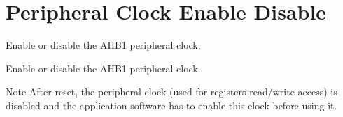\hypertarget{group___r_c_c_ex___peripheral___clock___enable___disable}{}\section{Peripheral Clock Enable Disable}
\label{group___r_c_c_ex___peripheral___clock___enable___disable}


Enable or disable the A\+H\+B1 peripheral clock.  


Enable or disable the A\+H\+B1 peripheral clock. 

\begin{DoxyNote}{Note}
After reset, the peripheral clock (used for registers read/write access) is disabled and the application software has to enable this clock before using it. 
\end{DoxyNote}
